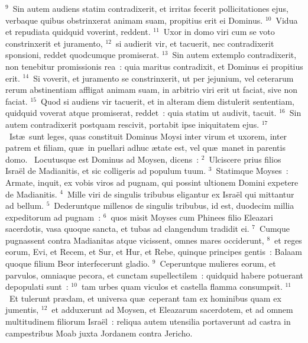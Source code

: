 ${}^{9}$~Sin autem audiens statim contradixerit, et irritas fecerit pollicitationes ejus, verbaque quibus obstrinxerat animam suam, propitius erit ei Dominus.
${}^{10}$~Vidua et repudiata quidquid voverint, reddent.
${}^{11}$~Uxor in domo viri cum se voto constrinxerit et juramento,
${}^{12}$~si audierit vir, et tacuerit, nec contradixerit sponsioni, reddet quodcumque promiserat.
${}^{13}$~Sin autem extemplo contradixerit, non tenebitur promissionis rea~: quia maritus contradixit, et Dominus ei propitius erit.
${}^{14}$~Si voverit, et juramento se constrinxerit, ut per jejunium, vel ceterarum rerum abstinentiam affligat animam suam, in arbitrio viri erit ut faciat, sive non faciat.
${}^{15}$~Quod si audiens vir tacuerit, et in alteram diem distulerit sententiam, quidquid voverat atque promiserat, reddet~: quia statim ut audivit, tacuit.
${}^{16}$~Sin autem contradixerit postquam rescivit, portabit ipse iniquitatem ejus.
${}^{17}$~Ist\ae\ sunt leges, quas constituit Dominus Moysi inter virum et uxorem, inter patrem et filiam, qu\ae\ in puellari adhuc \ae tate est, vel qu\ae\ manet in parentis domo.
~\lettrine[lines=10,image=true,loversize=0.05,lraise=-0.03]{L}{}ocutusque est Dominus ad Moysen, dicens~:
${}^{2}$~Ulciscere prius filios Isra\"el de Madianitis, et sic colligeris ad populum tuum.
${}^{3}$~Statimque Moyses~: Armate, inquit, ex vobis viros ad pugnam, qui possint ultionem Domini expetere de Madianitis.
${}^{4}$~Mille viri de singulis tribubus eligantur ex Isra\"el qui mittantur ad bellum.
${}^{5}$~Dederuntque millenos de singulis tribubus, id est, duodecim millia expeditorum ad pugnam~:
${}^{6}$~quos misit Moyses cum Phinees filio Eleazari sacerdotis, vasa quoque sancta, et tubas ad clangendum tradidit ei.
${}^{7}$~Cumque pugnassent contra Madianitas atque vicissent, omnes mares occiderunt,
${}^{8}$~et reges eorum, Evi, et Recem, et Sur, et Hur, et Rebe, quinque principes gentis~: Balaam quoque filium Beor interfecerunt gladio.
${}^{9}$~Ceperuntque mulieres eorum, et parvulos, omniaque pecora, et cunctam supellectilem~: quidquid habere potuerant depopulati sunt~:
${}^{10}$~tam urbes quam viculos et castella flamma consumpsit.
${}^{11}$~Et tulerunt pr\ae dam, et universa qu\ae\ ceperant tam ex hominibus quam ex jumentis,
${}^{12}$~et adduxerunt ad Moysen, et Eleazarum sacerdotem, et ad omnem multitudinem filiorum Isra\"el~: reliqua autem utensilia portaverunt ad castra in campestribus Moab juxta Jordanem contra Jericho.


